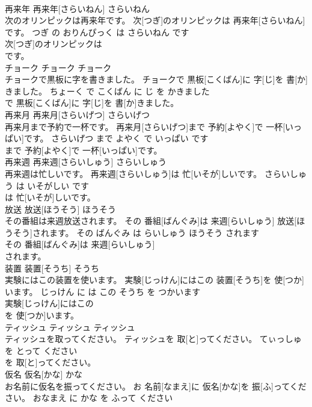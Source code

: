 \documentclass[8pt]{extreport}
\begin{document}
\begin{CJK}{UTF8}{min}
\\	再来年	再来年[さらいねん]	さらいねん	
\\	次のオリンピックは再来年です。	次[つぎ]のオリンピックは 再来年[さらいねん]です。	つぎ の おりんぴっく は さらいねん です	
\\	次[つぎ]のオリンピックは
\\	です。		
\\	チョーク	チョーク	チョーク	
\\	チョークで黒板に字を書きました。	チョークで 黒板[こくばん]に 字[じ]を 書[か]きました。	ちょーく で こくばん に じ を かきました	
\\	で 黒板[こくばん]に 字[じ]を 書[か]きました。		
\\	再来月	再来月[さらいげつ]	さらいげつ	
\\	再来月まで予約で一杯です。	再来月[さらいげつ]まで 予約[よやく]で 一杯[いっぱい]です。	さらいげつ まで よやく で いっぱい です	
\\	まで 予約[よやく]で 一杯[いっぱい]です。		
\\	再来週	再来週[さらいしゅう]	さらいしゅう	
\\	再来週は忙しいです。	再来週[さらいしゅう]は 忙[いそが]しいです。	さらいしゅう は いそがしい です	
\\	は 忙[いそが]しいです。		
\\	放送	放送[ほうそう]	ほうそう	
\\	その番組は来週放送されます。	その 番組[ばんぐみ]は 来週[らいしゅう] 放送[ほうそう]されます。	その ばんぐみ は らいしゅう ほうそう されます	
\\	その 番組[ばんぐみ]は 来週[らいしゅう]
\\	されます。		
\\	装置	装置[そうち]	そうち	
\\	実験にはこの装置を使います。	実験[じっけん]にはこの 装置[そうち]を 使[つか]います。	じっけん に は この そうち を つかいます	
\\	実験[じっけん]にはこの
\\	を 使[つか]います。		
\\	ティッシュ	ティッシュ	ティッシュ	
\\	ティッシュを取ってください。	ティッシュを 取[と]ってください。	てぃっしゅ を とって ください	
\\	を 取[と]ってください。		
\\	仮名	仮名[かな]	かな	
\\	お名前に仮名を振ってください。	お 名前[なまえ]に 仮名[かな]を 振[ふ]ってください。	おなまえ に かな を ふって ください	

\end{CJK}
\end{document}
